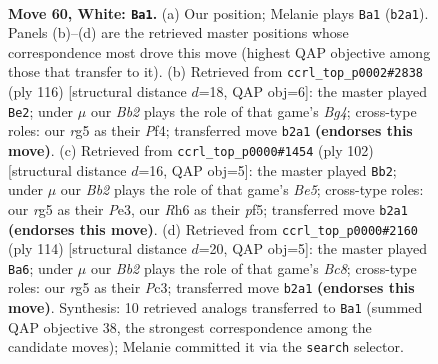 \documentclass[11pt]{article}
\begin{document}
\clearpage

\begin{figure}[p]\centering
\begin{subfigure}{0.46\textwidth}\centering
\resizebox{\linewidth}{!}{%
\newchessgame
\chessboard[
  setfen={5k2/8/7R/pp4r1/b1p5/P1P5/1B3K2/8 w - - 26 60},
  showmover=false,
  pgfstyle=straightmove, color=movearrow, markmove={b2-a1}
]}
\caption{}
\end{subfigure}\hfill
\begin{subfigure}{0.46\textwidth}\centering
\resizebox{\linewidth}{!}{%
\newchessgame
\chessboard[
  setfen={8/p5p1/Pbk4p/7P/4KPB1/8/8/8 w - - 23 59},
  showmover=false,
  pgfstyle=straightmove, color=movearrow, markmove={g4-e2}
]}
\caption{}
\end{subfigure}
\\[4pt]
\begin{subfigure}{0.46\textwidth}\centering
\resizebox{\linewidth}{!}{%
\newchessgame
\chessboard[
  setfen={8/8/7k/1p2Bp2/p1b3p1/P3P1P1/3K4/8 w - - 0 52},
  showmover=false,
  pgfstyle=straightmove, color=movearrow, markmove={e5-b2}
]}
\caption{}
\end{subfigure}\hfill
\begin{subfigure}{0.46\textwidth}\centering
\resizebox{\linewidth}{!}{%
\newchessgame
\chessboard[
  setfen={2B5/p7/1b1k4/p5p1/P5P1/2P5/2K5/8 w - - 4 58},
  showmover=false,
  pgfstyle=straightmove, color=movearrow, markmove={c8-a6}
]}
\caption{}
\end{subfigure}
\caption{\textbf{Move 60, White: \texttt{Ba1}.} (a) Our position; Melanie plays \texttt{Ba1} (\texttt{b2a1}). Panels (b)--(d) are the retrieved master positions whose correspondence most drove this move (highest QAP objective among those that transfer to it). (b) Retrieved from \texttt{ccrl\_top\_p0002\#2838} (ply 116) [structural distance $d$=18, QAP obj=6]: the master played \texttt{Be2}; under $\mu$ our \emph{Bb2} plays the role of that game's \emph{Bg4}; cross-type roles: our \emph{r}g5 as their \emph{P}f4; transferred move \texttt{b2a1} \textbf{(endorses this move)}. (c) Retrieved from \texttt{ccrl\_top\_p0000\#1454} (ply 102) [structural distance $d$=16, QAP obj=5]: the master played \texttt{Bb2}; under $\mu$ our \emph{Bb2} plays the role of that game's \emph{Be5}; cross-type roles: our \emph{r}g5 as their \emph{P}e3, our \emph{R}h6 as their \emph{p}f5; transferred move \texttt{b2a1} \textbf{(endorses this move)}. (d) Retrieved from \texttt{ccrl\_top\_p0000\#2160} (ply 114) [structural distance $d$=20, QAP obj=5]: the master played \texttt{Ba6}; under $\mu$ our \emph{Bb2} plays the role of that game's \emph{Bc8}; cross-type roles: our \emph{r}g5 as their \emph{P}c3; transferred move \texttt{b2a1} \textbf{(endorses this move)}. Synthesis: 10 retrieved analogs transferred to \texttt{Ba1} (summed QAP objective 38, the strongest correspondence among the candidate moves); Melanie committed it via the \texttt{search} selector.}
\label{fig:thought-m118}
\end{figure}
\end{document}
